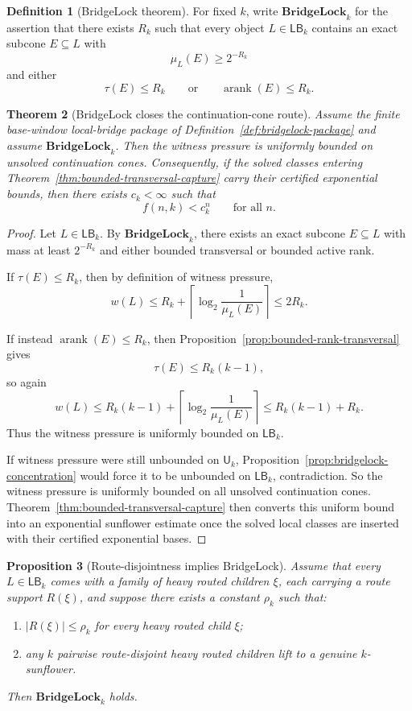 \documentclass[11pt]{article}
\newtheorem{theorem}{Theorem}[section]
\newtheorem{proposition}[theorem]{Proposition}
\theoremstyle{definition}
\newtheorem{definition}[theorem]{Definition}
\newcommand{\1}{\mathbf{1}}
\begin{document}
\begin{definition}[BridgeLock theorem]\label{def:bridgelock}
For fixed $k$, write $\mathbf{BridgeLock}_k$ for the assertion that there exists $R_k$ such that every object $L\in \mathsf{LB}_k$ contains an exact subcone $E\subseteq L$ with
\[
\mu_L(E)\ge 2^{-R_k}
\]
and either
\[
\tau(E)\le R_k
\qquad\text{or}\qquad
\operatorname{arank}(E)\le R_k.
\]
\end{definition}

\begin{theorem}[BridgeLock closes the continuation-cone route]\label{thm:bridgelock-closes}
Assume the finite base-window local-bridge package of Definition~\ref{def:bridgelock-package} and assume $\mathbf{BridgeLock}_k$. Then the witness pressure is uniformly bounded on unsolved continuation cones. Consequently, if the solved classes entering Theorem~\ref{thm:bounded-transversal-capture} carry their certified exponential bounds, then there exists $c_k<\infty$ such that
\[
f(n,k)<c_k^n
\qquad\text{for all }n.
\]
\end{theorem}

\begin{proof}
Let $L\in \mathsf{LB}_k$. By $\mathbf{BridgeLock}_k$, there exists an exact subcone $E\subseteq L$ with mass at least $2^{-R_k}$ and either bounded transversal or bounded active rank.

If $\tau(E)\le R_k$, then by definition of witness pressure,
\[
w(L)\le R_k+\left\lceil \log_2\frac{1}{\mu_L(E)}\right\rceil\le 2R_k.
\]

If instead $\operatorname{arank}(E)\le R_k$, then Proposition~\ref{prop:bounded-rank-transversal} gives
\[
\tau(E)\le R_k(k-1),
\]
so again
\[
w(L)\le R_k(k-1)+\left\lceil \log_2\frac{1}{\mu_L(E)}\right\rceil
\le R_k(k-1)+R_k.
\]
Thus the witness pressure is uniformly bounded on $\mathsf{LB}_k$.

If witness pressure were still unbounded on $\mathsf U_k$, Proposition~\ref{prop:bridgelock-concentration} would force it to be unbounded on $\mathsf{LB}_k$, contradiction. So the witness pressure is uniformly bounded on all unsolved continuation cones. Theorem~\ref{thm:bounded-transversal-capture} then converts this uniform bound into an exponential sunflower estimate once the solved local classes are inserted with their certified exponential bases.
\end{proof}

\begin{proposition}[Route-disjointness implies BridgeLock]\label{prop:route-disjointness-bridgelock}
Assume that every $L\in \mathsf{LB}_k$ comes with a family of heavy routed children $\xi$, each carrying a route support $R(\xi)$, and suppose there exists a constant $\rho_k$ such that:
\begin{enumerate}[label=(\roman*),leftmargin=2.2em]
\item $|R(\xi)|\le \rho_k$ for every heavy routed child $\xi$;
\item any $k$ pairwise route-disjoint heavy routed children lift to a genuine $k$-sunflower.
\end{enumerate}
Then $\mathbf{BridgeLock}_k$ holds.
\end{proposition}
\end{document}
